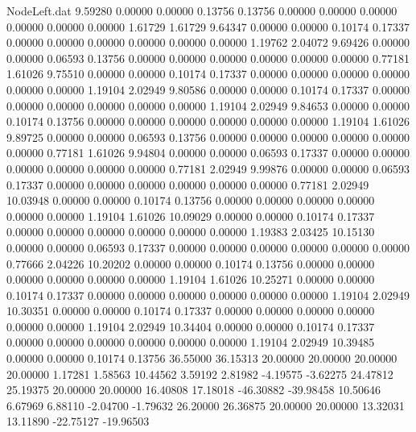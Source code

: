 \begin{filecontents}{NodeLeft.dat}
   9.59280    0.00000    0.00000     0.13756    0.13756    0.00000    0.00000    0.00000    0.00000    0.00000    0.00000    1.61729    1.61729
   9.64347    0.00000    0.00000     0.10174    0.17337    0.00000    0.00000    0.00000    0.00000    0.00000    0.00000    1.19762    2.04072
   9.69426    0.00000    0.00000     0.06593    0.13756    0.00000    0.00000    0.00000    0.00000    0.00000    0.00000    0.77181    1.61026
   9.75510    0.00000    0.00000     0.10174    0.17337    0.00000    0.00000    0.00000    0.00000    0.00000    0.00000    1.19104    2.02949
   9.80586    0.00000    0.00000     0.10174    0.17337    0.00000    0.00000    0.00000    0.00000    0.00000    0.00000    1.19104    2.02949
   9.84653    0.00000    0.00000     0.10174    0.13756    0.00000    0.00000    0.00000    0.00000    0.00000    0.00000    1.19104    1.61026
   9.89725    0.00000    0.00000     0.06593    0.13756    0.00000    0.00000    0.00000    0.00000    0.00000    0.00000    0.77181    1.61026
   9.94804    0.00000    0.00000     0.06593    0.17337    0.00000    0.00000    0.00000    0.00000    0.00000    0.00000    0.77181    2.02949
   9.99876    0.00000    0.00000     0.06593    0.17337    0.00000    0.00000    0.00000    0.00000    0.00000    0.00000    0.77181    2.02949
  10.03948    0.00000    0.00000     0.10174    0.13756    0.00000    0.00000    0.00000    0.00000    0.00000    0.00000    1.19104    1.61026
  10.09029    0.00000    0.00000     0.10174    0.17337    0.00000    0.00000    0.00000    0.00000    0.00000    0.00000    1.19383    2.03425
  10.15130    0.00000    0.00000     0.06593    0.17337    0.00000    0.00000    0.00000    0.00000    0.00000    0.00000    0.77666    2.04226
  10.20202    0.00000    0.00000     0.10174    0.13756    0.00000    0.00000    0.00000    0.00000    0.00000    0.00000    1.19104    1.61026
  10.25271    0.00000    0.00000     0.10174    0.17337    0.00000    0.00000    0.00000    0.00000    0.00000    0.00000    1.19104    2.02949
  10.30351    0.00000    0.00000     0.10174    0.17337    0.00000    0.00000    0.00000    0.00000    0.00000    0.00000    1.19104    2.02949
  10.34404    0.00000    0.00000     0.10174    0.17337    0.00000    0.00000    0.00000    0.00000    0.00000    0.00000    1.19104    2.02949
  10.39485    0.00000    0.00000     0.10174    0.13756   36.55000   36.15313   20.00000   20.00000   20.00000   20.00000    1.17281    1.58563
  10.44562    3.59192    2.81982    -4.19575   -3.62275   24.47812   25.19375   20.00000   20.00000   16.40808   17.18018  -46.30882  -39.98458
  10.50646    6.67969    6.88110    -2.04700   -1.79632   26.20000   26.36875   20.00000   20.00000   13.32031   13.11890  -22.75127  -19.96503

\end{filecontents}
